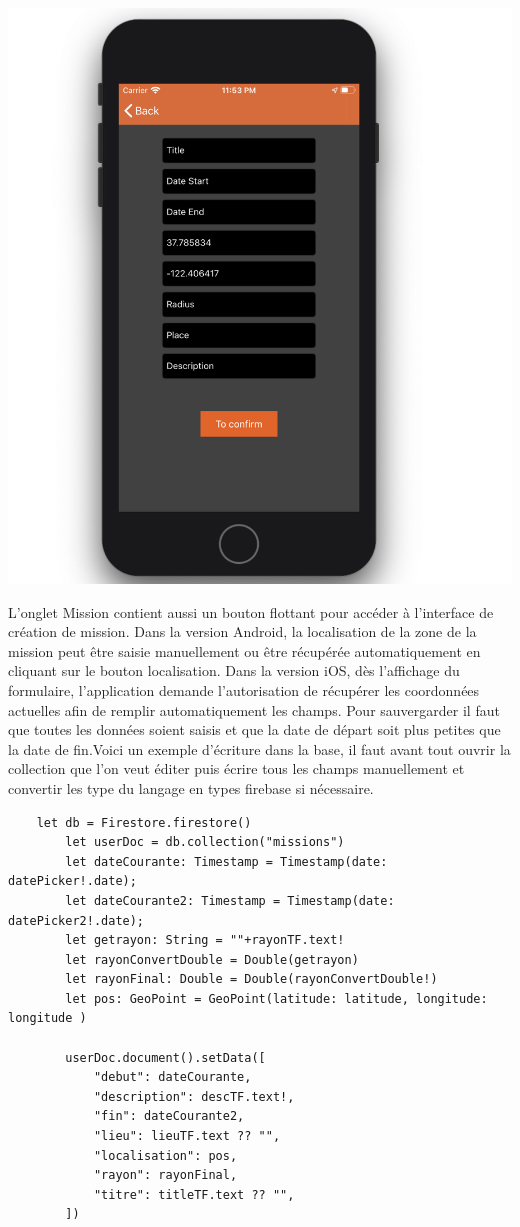 \documentclass{article}
\begin{document}
\begin{center}
    \includegraphics[scale=0.15]{ajoutMIOS.png}
\end{center}
L'onglet Mission contient aussi un bouton flottant pour accéder à l'interface de création de mission. Dans la version Android, la localisation de la zone de la mission peut être saisie manuellement ou être récupérée automatiquement en cliquant sur le bouton localisation. Dans la version iOS, dès l'affichage du formulaire, l'application demande l’autorisation de récupérer les coordonnées actuelles afin de remplir automatiquement les champs.
Pour sauvergarder il faut que toutes les données soient saisis et que la date de départ soit plus petites que la date de fin.Voici un exemple d’écriture dans la base, il faut avant tout ouvrir la collection que l’on veut éditer puis écrire tous les champs manuellement et convertir les type du langage en types firebase si nécessaire.

\newpage

\begin{verbatim}
    let db = Firestore.firestore()
        let userDoc = db.collection("missions")
        let dateCourante: Timestamp = Timestamp(date: datePicker!.date);
        let dateCourante2: Timestamp = Timestamp(date: datePicker2!.date);
        let getrayon: String = ""+rayonTF.text!
        let rayonConvertDouble = Double(getrayon)
        let rayonFinal: Double = Double(rayonConvertDouble!)
        let pos: GeoPoint = GeoPoint(latitude: latitude, longitude: longitude )
        
        userDoc.document().setData([
            "debut": dateCourante,
            "description": descTF.text!,
            "fin": dateCourante2,
            "lieu": lieuTF.text ?? "",
            "localisation": pos,
            "rayon": rayonFinal,
            "titre": titleTF.text ?? "",
        ])
\end{verbatim}
\end{document}
